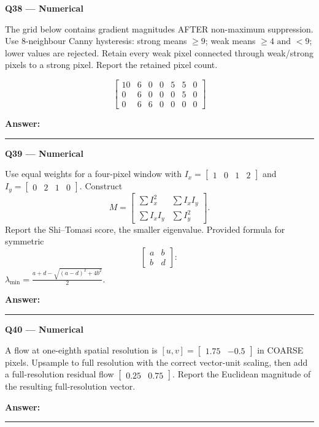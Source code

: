\documentclass[11pt,a4paper]{article}
\begin{document}
\par\vspace{12pt}
\begin{minipage}{\linewidth}
\textbf{Q38 — Numerical}\par\smallskip
The grid below contains gradient magnitudes AFTER non-maximum suppression. Use 8-neighbour Canny hysteresis: strong means \(\ge9\); weak means \(\ge4\text{ and }<9\); lower values are rejected. Retain every weak pixel connected through weak/\allowbreak{}strong pixels to a strong pixel. Report the retained pixel count.


\[
\begin{bmatrix}10&6&0&0&5&5&0\\0&6&0&0&0&5&0\\0&6&6&0&0&0&0\end{bmatrix}
\]

\par\medskip\textbf{Answer:} \rule{55mm}{0.4pt}
\end{minipage}
\par\vspace{12pt}
\begin{minipage}{\linewidth}
\textbf{Q39 — Numerical}\par\smallskip
Use equal weights for a four-pixel window with \(I_x=\begin{bmatrix}1&0&1&2\end{bmatrix}\) and \(I_y=\begin{bmatrix}0&2&1&0\end{bmatrix}\). Construct
\[M=\begin{bmatrix}\sum I_x^2&\sum I_x I_y\\\sum I_x I_y&\sum I_y^2\end{bmatrix}.\]
 Report the Shi–Tomasi score,\allowbreak{} the smaller eigenvalue. Provided formula for symmetric
\[\begin{bmatrix}a&b\\b&d\end{bmatrix}:\]
 \(\lambda_{\min}=\frac{a+d-\sqrt{(a-d)^2+4b^2}}{2}\).
\par\medskip\textbf{Answer:} \rule{55mm}{0.4pt}
\end{minipage}
\par\vspace{12pt}
\begin{minipage}{\linewidth}
\textbf{Q40 — Numerical}\par\smallskip
A flow at one-eighth spatial resolution is \([u,v]=\begin{bmatrix}1.75&-0.5\end{bmatrix}\) in COARSE pixels. Upsample to full resolution with the correct vector-unit scaling,\allowbreak{} then add a full-resolution residual flow \(\begin{bmatrix}0.25&0.75\end{bmatrix}\). Report the Euclidean magnitude of the resulting full-resolution vector.
\par\medskip\textbf{Answer:} \rule{55mm}{0.4pt}
\end{minipage}
\end{document}
